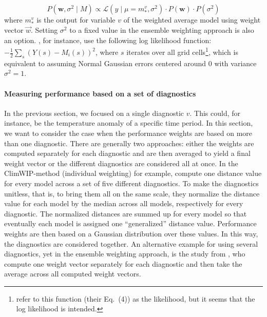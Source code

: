 %
\begin{equation}
    P(\mathbf{w}, \sigma^2\mid M) \propto \mathcal{L}(y \mid \mu=m_*^v, \sigma^2) \cdot P(\mathbf{w}) \cdot P(\sigma^2)
\end{equation}
where $m_*^v$ is the output for variable $v$ of the weighted average model using weight vector $\vec{w}$.
%
Setting $\sigma^2$ to a fixed value in the ensemble weighting approach is also an option.  \citet{massoudBayesianModelAveraging2020}, for instance, use the following log likelihood function: $-\frac{1}{2} \sum_{s} (Y(s) - M_i(s))^2$, where $s$ iterates over all grid cells\footnote{\citet{massoudBayesianModelAveraging2020} refer to this function (their Eq.~(4)) as the likelihood, but it seems that the log likelihood is intended.}, which is equivalent to assuming Normal Gaussian errors centered around 0 with variance $\sigma^2=1$.


\paragraph*{Measuring performance based on a set of diagnostics}\label{sec:measuring-performance-combined-diagnostics}

In the previous section, we focused on a single diagnostic $v$. This could, for instance, be the temperature anomaly of a specific time period. 
In this section, we want to consider the case when the performance weights are based on more than one diagnostic.
There are generally two approaches: either the weights are computed separately for each diagnostic and are then averaged to yield a final weight vector or the different diagnostics are considered all at once.
In the ClimWIP-method (individual weighting) for example, \citet{brunnerReducedGlobalWarming2020} compute one distance value for every model across a set of five different diagnostics. To make the diagnostics unitless, that is, to bring them all on the same scale, they normalize the distance value for each model by the median across all models, respectively for every diagnostic. 
The normalized distances are summed up for every model so that eventually each model is assigned one ``generalized'' distance value.
Performance weights are then based on a Gaussian distribution over these values. In this way, the diagnostics are considered together. An alternative example for using several diagnostics, yet in the  ensemble weighting approach, is the study from \citet{massoudBayesianModelAveraging2020}, who compute one weight vector separately for each diagnostic and then take the average across all computed weight vectors.

